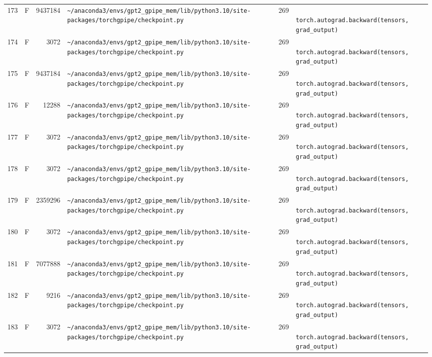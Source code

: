 \documentclass{article}
\begin{document}
\begin{longtable}{r l r p{6.5cm} r p{7.0cm}}
173 & F & 9437184 & \lstinline|~/anaconda3/envs/gpt2_gpipe_mem/lib/python3.10/site-packages/torchgpipe/checkpoint.py| & 269 & \lstinline|            torch.autograd.backward(tensors, grad_output)| \\
174 & F & 3072 & \lstinline|~/anaconda3/envs/gpt2_gpipe_mem/lib/python3.10/site-packages/torchgpipe/checkpoint.py| & 269 & \lstinline|            torch.autograd.backward(tensors, grad_output)| \\
175 & F & 9437184 & \lstinline|~/anaconda3/envs/gpt2_gpipe_mem/lib/python3.10/site-packages/torchgpipe/checkpoint.py| & 269 & \lstinline|            torch.autograd.backward(tensors, grad_output)| \\
176 & F & 12288 & \lstinline|~/anaconda3/envs/gpt2_gpipe_mem/lib/python3.10/site-packages/torchgpipe/checkpoint.py| & 269 & \lstinline|            torch.autograd.backward(tensors, grad_output)| \\
177 & F & 3072 & \lstinline|~/anaconda3/envs/gpt2_gpipe_mem/lib/python3.10/site-packages/torchgpipe/checkpoint.py| & 269 & \lstinline|            torch.autograd.backward(tensors, grad_output)| \\
178 & F & 3072 & \lstinline|~/anaconda3/envs/gpt2_gpipe_mem/lib/python3.10/site-packages/torchgpipe/checkpoint.py| & 269 & \lstinline|            torch.autograd.backward(tensors, grad_output)| \\
179 & F & 2359296 & \lstinline|~/anaconda3/envs/gpt2_gpipe_mem/lib/python3.10/site-packages/torchgpipe/checkpoint.py| & 269 & \lstinline|            torch.autograd.backward(tensors, grad_output)| \\
180 & F & 3072 & \lstinline|~/anaconda3/envs/gpt2_gpipe_mem/lib/python3.10/site-packages/torchgpipe/checkpoint.py| & 269 & \lstinline|            torch.autograd.backward(tensors, grad_output)| \\
181 & F & 7077888 & \lstinline|~/anaconda3/envs/gpt2_gpipe_mem/lib/python3.10/site-packages/torchgpipe/checkpoint.py| & 269 & \lstinline|            torch.autograd.backward(tensors, grad_output)| \\
182 & F & 9216 & \lstinline|~/anaconda3/envs/gpt2_gpipe_mem/lib/python3.10/site-packages/torchgpipe/checkpoint.py| & 269 & \lstinline|            torch.autograd.backward(tensors, grad_output)| \\
183 & F & 3072 & \lstinline|~/anaconda3/envs/gpt2_gpipe_mem/lib/python3.10/site-packages/torchgpipe/checkpoint.py| & 269 & \lstinline|            torch.autograd.backward(tensors, grad_output)| \\

\end{longtable}
\end{document}
